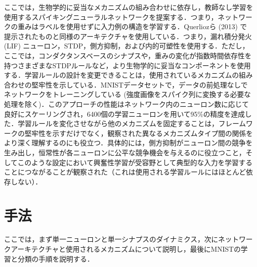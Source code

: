 \documentclass[a4paper, titlepage]{jsarticle}
\begin{document}
\par
ここでは，生物学的に妥当なメカニズムの組み合わせに依存し，教師なし学習を使用するスパイキングニューラルネットワークを提案する．つまり，ネットワークの重みはラベルを使用せずに入力例の構造を学習する．Querliozら (2013) で提示されたものと同様のアーキテクチャを使用している．つまり，漏れ積分発火 (LIF) ニューロン，STDP，側方抑制，および内的可塑性を使用する．ただし，ここでは，コンダクタンスベースのシナプスや，重みの変化が指数時間依存性を持つさまざまなSTDPルールなど，より生物学的に妥当なコンポーネントを使用する．学習ルールの設計を変更できることは，使用されているメカニズムの組み合わせの堅牢性を示している．MNISTデータセットで，データの前処理なしでネットワークをトレーニングしている (強度画像をスパイク列に変換する必要な処理を除く)．このアプローチの性能はネットワーク内のニューロン数に応じて良好にスケーリングされ，6400個の学習ニューロンを用いて95\%の精度を達成した．学習ルールを変化させながら他のメカニズムを固定することは，フレームワークの堅牢性を示すだけでなく，観察された異なるメカニズムタイプ間の関係をより深く理解するのにも役立つ．具体的には，側方抑制がニューロン間の競争を生み出し，恒常性が各ニューロンに公平な競争機会を与えるのに役立つこと，そしてこのような設定において興奮性学習が受容野として典型的な入力を学習することにつながることが観察された（これは使用される学習ルールにはほとんど依存しない）．

\section{手法}
ここでは，まず単一ニューロンと単一シナプスのダイナミクス，次にネットワークアーキテクチャと使用されるメカニズムについて説明し，最後にMNISTの学習と分類の手順を説明する．
\end{document}
